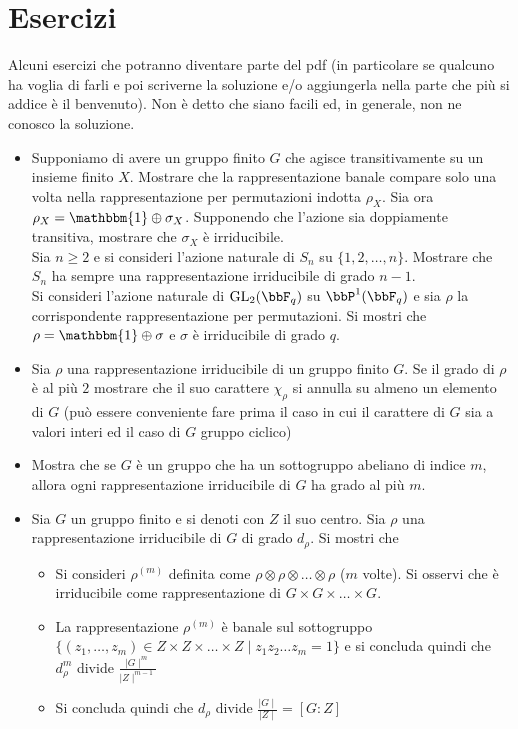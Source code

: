 \documentclass[a4paper,NoNotes,GeneralMath]{stdmdoc}
\begin{document}
	\section{Esercizi}
	Alcuni esercizi che potranno diventare parte del pdf (in particolare se qualcuno ha voglia di farli e poi scriverne la soluzione e/o aggiungerla nella parte che più si addice è il benvenuto). Non è detto che siano facili ed, in generale, non ne conosco la soluzione.
	\begin{itemize}
		\item Supponiamo di avere un gruppo finito $G$ che agisce transitivamente su un insieme finito $X$. Mostrare che la rappresentazione banale compare solo una volta nella rappresentazione per permutazioni indotta $\rho_X$. Sia ora $\rho_X = \mathbbm{1} \oplus \sigma_X$. Supponendo che l'azione sia doppiamente transitiva, mostrare che $\sigma_X$ è irriducibile. \\
		Sia $n \ge 2$ e si consideri l'azione naturale di $S_n$ su $\{1, 2, \ldots, n\}$. Mostrare che $S_n$ ha sempre una rappresentazione irriducibile di grado $n-1$. \\
		Si consideri l'azione naturale di $\text{GL}_2(\bbF_q)$ su $\bbP^1(\bbF_q)$ e sia $\rho$ la corrispondente rappresentazione per permutazioni. Si mostri che $\rho = \mathbbm{1} \oplus \sigma$ e $\sigma$ è irriducibile di grado $q$.

		\item Sia $\rho$ una rappresentazione irriducibile di un gruppo finito $G$. Se il grado di $\rho$ è al più $2$ mostrare che il suo carattere $\chi_\rho$ si annulla su almeno un elemento di $G$ (può essere conveniente fare prima il caso in cui il carattere di $G$ sia a valori interi ed il caso di $G$ gruppo ciclico)

		\item Mostra che se $G$ è un gruppo che ha un sottogruppo abeliano di indice $m$, allora ogni rappresentazione irriducibile di $G$ ha grado al più $m$.

		\item Sia $G$ un gruppo finito e si denoti con $Z$ il suo centro. Sia $\rho$ una rappresentazione irriducibile di $G$ di grado $d_\rho$. Si mostri che
			\begin{itemize}
				\item Si consideri $\rho^{(m)}$ definita come $\rho \otimes \rho \otimes \ldots \otimes \rho$ ($m$ volte). Si osservi che è irriducibile come rappresentazione di $G \times G \times \ldots \times G$.
				\item La rappresentazione $\rho^{(m)}$ è banale sul sottogruppo $\{ (z_1, \ldots, z_m) \in Z \times Z \times \ldots \times Z \mid z_1z_2\ldots z_m = 1 \}$ e si concluda quindi che $d_\rho^m$ divide $\frac{\mid G \mid^m}{\mid Z \mid^{m-1}}$
				\item Si concluda quindi che $d_\rho$ divide $\frac{\mid G \mid}{\mid Z \mid} = [G: Z]$
			\end{itemize}


\end{itemize}
\end{document}
